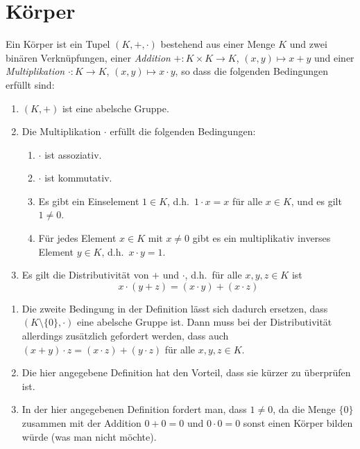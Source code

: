 \section{Körper}


\begin{defi}
 Ein Körper ist ein Tupel $(K, +, \cdot)$ bestehend aus einer Menge $K$ und zwei binären Verknüpfungen, einer \emph{Addition} $+ \colon K \times K \to K$, $(x,y) \mapsto x + y$ und einer \emph{Multiplikation} $\cdot \colon K \to K$, $(x,y) \mapsto x \cdot y$, so dass die folgenden Bedingungen erfüllt sind:
 \begin{enumerate}[label=\roman*)]
  \item
   $(K,+)$ ist eine abelsche Gruppe.
  \item
   Die Multiplikation $\cdot$ erfüllt die folgenden Bedingungen:
   \begin{enumerate}[label=\alph*)]
    \item
     $\cdot$ ist assoziativ.
    \item
     $\cdot$ ist kommutativ.
    \item
     Es gibt ein Einselement $1 \in K$, d.h.\ $1 \cdot x = x$ für alle $x \in K$, und es gilt $1 \neq 0$.
    \item
     Für jedes Element $x \in K$ mit $x \neq 0$ gibt es ein multiplikativ inverses Element $y \in K$, d.h.\ $x \cdot y = 1$.
   \end{enumerate}
  \item
   Es gilt die Distributivität von $+$ und $\cdot$, d.h.\ für alle $x,y,z \in K$ ist
   \[
    x \cdot (y + z)
    = (x \cdot y) + (x \cdot z)
   \]
 \end{enumerate}
\end{defi}


\begin{bem}
 \begin{enumerate}[leftmargin=*]
  \item
   Die zweite Bedingung in der Definition lässt sich dadurch ersetzen, dass $(K\setminus\{0\},\cdot)$ eine abelsche Gruppe ist. Dann muss bei der Distributivität allerdings zusätzlich gefordert werden, dass auch $(x+y) \cdot z = (x \cdot z) + (y \cdot z)$ für alle $x,y,z \in K$.
  \item
   Die hier angegebene Definition hat den Vorteil, dass sie kürzer zu überprüfen ist.
  \item
   In der hier angegebenen Definition fordert man, dass $1 \neq 0$, da die Menge $\{0\}$ zusammen mit der Addition $0 + 0 = 0$ und $0 \cdot 0 = 0$ sonst einen Körper bilden würde (was man nicht möchte).
 \end{enumerate}
\end{bem}


